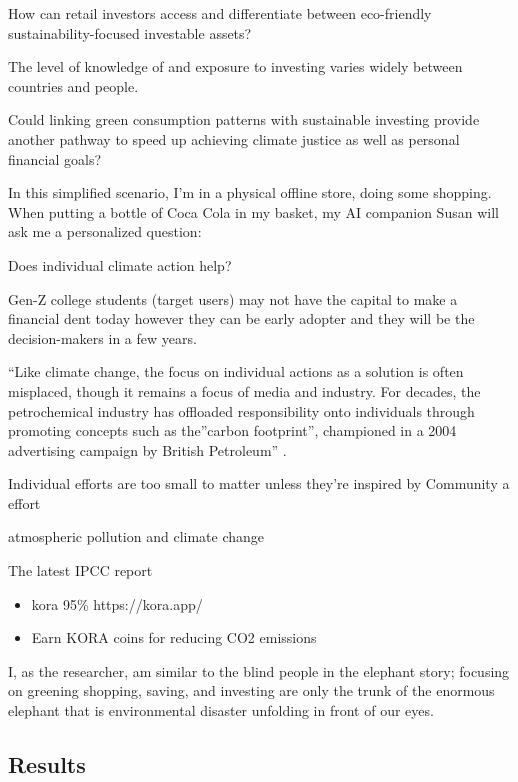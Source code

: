 \documentclass[
  letterpaper,
  DIV=11,
  numbers=noendperiod]{scrartcl}
\begin{document}
How can retail investors access and differentiate between eco-friendly
sustainability-focused investable assets?

The level of knowledge of and exposure to investing varies widely
between countries and people.

Could linking green consumption patterns with sustainable investing
provide another pathway to speed up achieving climate justice as well as
personal financial goals?

In this simplified scenario, I'm in a physical offline store, doing some
shopping. When putting a bottle of Coca Cola in my basket, my AI
companion Susan will ask me a personalized question:

Does individual climate action help?

Gen-Z college students (target users) may not have the capital to make a
financial dent today however they can be early adopter and they will be
the decision-makers in a few years.

``Like climate change, the focus on individual actions as a solution is
often misplaced, though it remains a focus of media and industry. For
decades, the petrochemical industry has offloaded responsibility onto
individuals through promoting concepts such as the''carbon footprint'',
championed in a 2004 advertising campaign by British Petroleum'' \citep[
in
\citet{laversFarDistractionPlastic2022}]{cherryProfitRethinkingCorporate2010}.

Individual efforts are too small to matter unless they're inspired by
Community a effort

atmospheric pollution and climate change

The latest IPCC report \citet{calvinIPCC2023Climate2023}

\citet{dimockDefiningGenerationsWhere2019}

\begin{itemize}
\item
  kora 95\% https://kora.app/
\item
  Earn KORA coins for reducing CO2 emissions
\end{itemize}

I, as the researcher, am similar to the blind people in the elephant
story; focusing on greening shopping, saving, and investing are only the
trunk of the enormous elephant that is environmental disaster unfolding
in front of our eyes.

\subsection{Results}\label{results-1}
\end{document}
